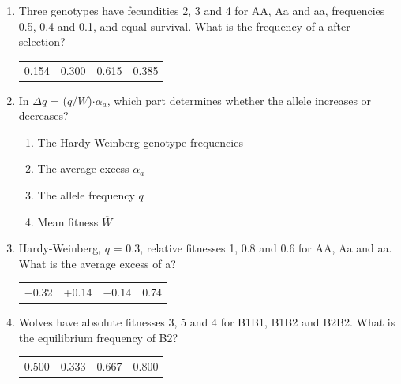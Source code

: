\documentclass[11pt]{article}
\newcommand{\work}[1]{\par\vspace{#1}}
\begin{document}
\begin{enumerate}[label=\textbf{\arabic*.}, leftmargin=2em, itemsep=1.4em]
\item Three genotypes have fecundities 2, 3 and 4 for AA, Aa and aa, frequencies 0.5, 0.4 and 0.1, and equal survival. What is the frequency of a after selection?
\par\smallskip\noindent\begin{tabularx}{\linewidth}{@{}YYYY@{}}
0.154 & 0.300 & 0.615 & 0.385 \\
\end{tabularx}
\work{1.6cm}
\item In \(\Delta q\) = (\(q\)/\(\overline{W}\))\(\cdot \alpha_{a}\), which part determines whether the allele increases or decreases?
\par\smallskip
\begin{enumerate}[label={}, leftmargin=2.4em, labelwidth=0pt, itemsep=2pt, topsep=0pt]
\item \hspace*{-2.4em}The Hardy-Weinberg genotype frequencies
\item \hspace*{-2.4em}The average excess \(\alpha_{a}\)
\item \hspace*{-2.4em}The allele frequency \(q\)
\item \hspace*{-2.4em}Mean fitness \(\overline{W}\)
\end{enumerate}
\item Hardy-Weinberg, \(q\) = 0.3, relative fitnesses 1, 0.8 and 0.6 for AA, Aa and aa. What is the average excess of a?
\par\smallskip\noindent\begin{tabularx}{\linewidth}{@{}YYYY@{}}
\(-\)0.32 & +0.14 & \(-\)0.14 & 0.74 \\
\end{tabularx}
\work{1.6cm}
\item Wolves have absolute fitnesses 3, 5 and 4 for B1B1, B1B2 and B2B2. What is the equilibrium frequency of B2?
\par\smallskip\noindent\begin{tabularx}{\linewidth}{@{}YYYY@{}}
0.500 & 0.333 & 0.667 & 0.800 \\

\end{tabularx}
\end{enumerate}
\end{document}
